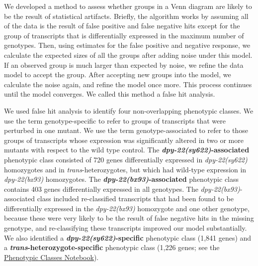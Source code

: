 \documentclass[8pt, twocolumn]{article}
\newcommand{\gene}[1]{\mbox{\emph{#1}}}
\newcommand{\dpy}[1]{\gene{dpy-22#1}}
\newcommand{\bx}{\dpy{(bx93)}}
\newcommand{\sy}{\dpy{(sy622)}}
\begin{document}
We developed a method to assess whether groups in a Venn diagram are likely to
be the result of statistical artifacts. Briefly, the algorithm works by assuming
all of the data is the result of false positive and false negative hits except
for the group of transcripts that is differentially expressed in the maximum
number of genotypes. Then, using estimates for the false positive and negative
response, we calculate the expected sizes of all the groups after adding noise
under this model. If an observed group is much larger than expected by noise, we
refine the data model to accept the group. After accepting new groups into the
model, we calculate the noise again, and refine the model once more. This
process continues until the model converges. We called this method a false hit
analysis.

We used false hit analysis to identify four non-overlapping phenotypic classes.
We use the term genotype-specific to refer to groups of transcripts that were
perturbed in one mutant. We use the term genotype-associated to refer to those
groups of transcripts whose expression was significantly altered in two or more
mutants with respect to the wild type control. The \textbf{\sy{}-associated}
phenotypic class consisted of 720 genes differentially expressed in \sy{}
homozygotes and in \emph{trans}-heterozygotes, but which had wild-type
expression in \bx{} homozygotes. The \textbf{\bx{}-associated} phenotypic class
contains 403 genes differentially expressed in all genotypes. The
\bx{}-associated class included re-classified transcripts that had been found to
be differentially expressed in the \bx{} homozygote and one other genotype,
because these were very likely to be the result of false negative hits in the
missing genotype, and re-classifying these transcripts improved our model
substantially. We also identified a \textbf{\sy{}-specific} phenotypic class
(1,841 genes) and a \textbf{\emph{trans}-heterozygote-specific} phenotypic class
(1,226 genes; see the
\href{https://wormlabcaltech.github.io/med-cafe/notebook/phenotypic_classes.html}{
Phenotypic Classes Notebook}).
\end{document}
